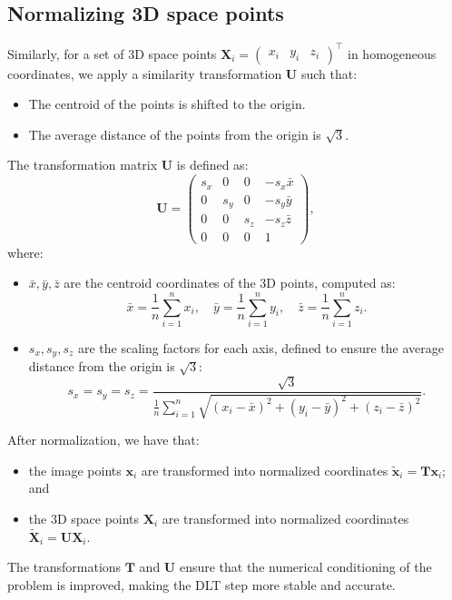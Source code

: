 \documentclass[12pt]{article}
\begin{document}
\subsection{Normalizing 3D space points}
Similarly, for a set of 3D space points $ \mathbf{X}_i = \begin{pmatrix} x_i & y_i & z_i \end{pmatrix}^\top $ in homogeneous coordinates, we apply a similarity transformation $ \mathbf{U} $ such that:
\begin{itemize}
    \item The centroid of the points is shifted to the origin.
    \item The average distance of the points from the origin is $\sqrt{3}$.
\end{itemize}

The transformation matrix $ \mathbf{U} $ is defined as:
$$
\mathbf{U} = 
\begin{pmatrix} 
s_x & 0 & 0 & -s_x \bar{x} \\
0 & s_y & 0 & -s_y \bar{y} \\
0 & 0 & s_z & -s_z \bar{z} \\
0 & 0 & 0 & 1
\end{pmatrix},
$$
where:
\begin{itemize}
    \item $ \bar{x}, \bar{y}, \bar{z} $ are the centroid coordinates of the 3D points, computed as:
    $$
    \bar{x} = \frac{1}{n} \sum_{i=1}^n x_i, \quad \bar{y} = \frac{1}{n} \sum_{i=1}^n y_i, \quad \bar{z} = \frac{1}{n} \sum_{i=1}^n z_i.
    $$
    \item $ s_x, s_y, s_z $ are the scaling factors for each axis, defined to ensure the average distance from the origin is $\sqrt{3}$:
    $$
    s_x = s_y = s_z = \frac{\sqrt{3}}{\displaystyle\frac{1}{n} \sum_{i=1}^n \sqrt{(x_i - \bar{x})^2 + (y_i - \bar{y})^2 + (z_i - \bar{z})^2}}.
    $$
\end{itemize}

After normalization, we have that:
\begin{itemize}
    \item the image points $ \mathbf{x}_i $ are transformed into normalized coordinates $ \tilde{\mathbf{x}}_i = \mathbf{T} \mathbf{x}_i $; and
    \item the 3D space points $ \mathbf{X}_i $ are transformed into normalized coordinates $ \tilde{\mathbf{X}}_i = \mathbf{U} \mathbf{X}_i $.
\end{itemize}
The transformations $ \mathbf{T} $ and $ \mathbf{U} $ ensure that the numerical conditioning of the problem is improved, making the DLT step more stable and accurate.
\end{document}
